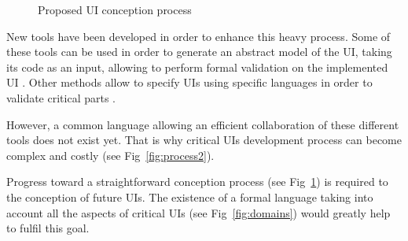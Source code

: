 \documentclass{sigchi}
\begin{document}
\begin{figure}
\centering
{}

\caption{Proposed UI conception process}
\label{fig:process3}
\end{figure}

New tools have been developed in order to enhance this heavy process. Some of these tools can be used in order to generate an abstract model of the UI, taking its code as an input, allowing to perform formal validation on the implemented UI \cite{Cortier2008}. Other methods allow to specify UIs using specific languages in order to validate critical parts \cite{madani2007}.

However, a common language allowing an efficient collaboration of these different tools does not exist yet. That is why critical UIs development process can become complex and costly (see Fig~\ref{fig:process2}). 

Progress toward a straightforward conception process (see Fig~\ref{fig:process3}) is required to the conception of future UIs. The existence of a formal language taking into account all the aspects of critical UIs (see Fig~\ref{fig:domains}) would greatly help to fulfil this goal.
\end{document}
